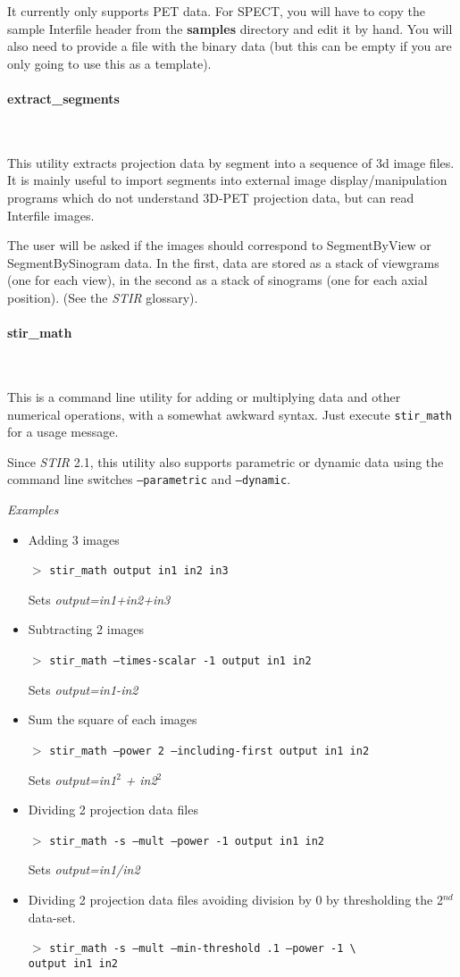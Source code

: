 \documentclass{article}
\newcommand{\subsubsubsection}[1]{\paragraph{#1}\mbox{} \\}
\newcommand{\cmdline}[1]{\par \noindent $>$ \texttt{#1}\par}
\begin{document}
{{{It currently only supports PET data. For SPECT, you will have to copy the
sample Interfile header from the \textbf{samples} directory and edit it by hand.
You will also need to provide a file with the binary data (but this can be empty if
you are only going to use this as a template).

{ \subsubsubsection{extract\_segments}
}

This utility extracts projection data by segment into a sequence 
of 3d image files. It is mainly useful to import segments into 
external image display/manipulation programs which do not understand 
3D-PET projection data, but can read Interfile images.


The user will be asked if the images should correspond to SegmentByView 
or SegmentBySinogram data. In the first, data are stored as a 
stack of viewgrams (one for each view), in the second as a stack 
of sinograms (one for each axial position). (See the \textit{STIR} glossary).

{ \subsubsubsection{stir\_math}
}
\label{sec:stir_math}

This is a command line utility for adding or multiplying data 
and other numerical operations, with a somewhat awkward syntax. 
Just execute \texttt{stir\_math} for a usage message.

Since \textit{STIR} 2.1, this utility also supports parametric or dynamic data using
the command line switches \texttt{--parametric} and \texttt{--dynamic}.

\textit{Examples}
\begin{itemize}
\item
Adding 3 images
\cmdline{stir\_math output in1 in2 in3}

Sets \textit{output=in1+in2+in3}\\
\item
Subtracting 2 images
\cmdline{stir\_math --times-scalar -1 output in1 in2}


Sets \textit{output=in1-in2}\\
\item
Sum the square of each images
\cmdline{stir\_math --power 2 --including-first output in1 in2}


Sets \textit{output=in1}$^{\mathit{2}}$ \textit{+ in2}$^{\mathit{2}}$\\
\item
Dividing 2 projection data files
\cmdline{stir\_math -s --mult --power -1 output in1 in2}


Sets \textit{output=in1/in2}\\
\item
Dividing 2 projection data files avoiding division by 0 by thresholding 
the 2$^{nd}$ data-set.
\cmdline{stir\_math -s --mult --min-threshold .1 --power -1 {\textbackslash}\\
output in1 in2}



\end{itemize}}}}
\end{document}
